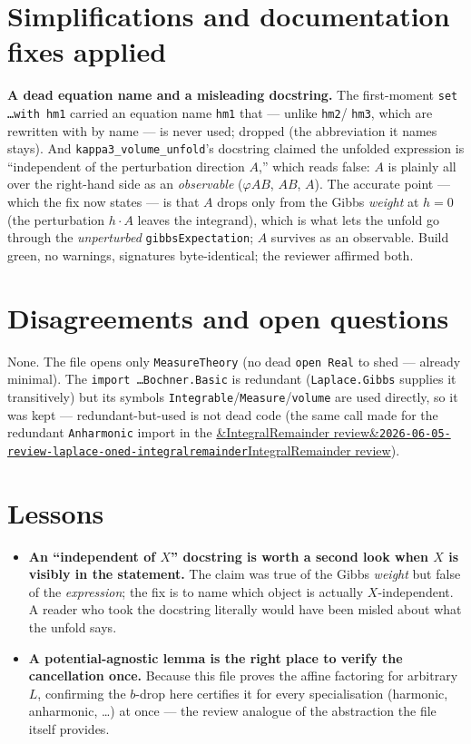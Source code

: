 \documentclass[11pt]{article}
\newcommand{\reviewref}[2][]{\href{https://therisensea.org/reviews/#2/}{\ifx&#1&\texttt{#2}\else#1\fi}}
\begin{document}
\section{Simplifications and documentation fixes applied}
\textbf{A dead equation name and a misleading docstring.} The first-moment
\texttt{set \dots with hm1} carried an equation name \texttt{hm1} that --- unlike \texttt{hm2}/
\texttt{hm3}, which are rewritten with by name --- is never used; dropped (the abbreviation it names
stays). And \texttt{kappa3\_volume\_unfold}'s
docstring claimed the unfolded expression is ``independent of the perturbation direction $A$,'' which
reads false: $A$ is plainly all over the right-hand side as an \emph{observable} ($\varphi A B$, $AB$,
$A$). The accurate point --- which the fix now states --- is that $A$ drops only from the Gibbs
\emph{weight} at $h=0$ (the perturbation $h\cdot A$ leaves the integrand), which is what lets the unfold
go through the \emph{unperturbed} \texttt{gibbsExpectation}; $A$ survives as an observable. Build green,
no warnings, signatures byte-identical; the reviewer affirmed both.

\section{Disagreements and open questions}
None. The file opens only \texttt{MeasureTheory} (no dead \texttt{open Real} to shed --- already
minimal). The \texttt{import \dots Bochner.Basic} is redundant (\texttt{Laplace.Gibbs} supplies it
transitively) but its symbols \texttt{Integrable}/\texttt{Measure}/\texttt{volume} are used directly, so
it was kept --- redundant-but-used is not dead code (the same call made for the redundant
\texttt{Anharmonic} import in the
\reviewref[IntegralRemainder review]{2026-06-05-review-laplace-oned-integralremainder}).

\section{Lessons}
\begin{itemize}[noitemsep]
  \item \textbf{An ``independent of $X$'' docstring is worth a second look when $X$ is visibly in the
    statement.} The claim was true of the Gibbs \emph{weight} but false of the \emph{expression}; the
    fix is to name which object is actually $X$-independent. A reader who took the docstring literally
    would have been misled about what the unfold says.
  \item \textbf{A potential-agnostic lemma is the right place to verify the cancellation once.} Because
    this file proves the affine factoring for arbitrary $L$, confirming the $b$-drop here certifies it
    for every specialisation (harmonic, anharmonic, \dots) at once --- the review analogue of the
    abstraction the file itself provides.
\end{itemize}
\end{document}
